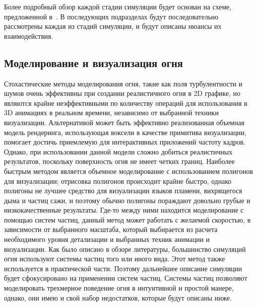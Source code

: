 Более подробный обзор каждой стадии симуляции будет основан на схеме,
предложенной в~\cite{realistic_sim}. В последующих подразделах будут
последовательно рассмотрены каждая из стадий симуляции, и будут описаны нюансы
их взаимодействия.

\subsection{Моделирование и визуализация огня}

Стохастические методы моделирования огня, такие как поля турбулентности и шумов
очень эффективны при создании реалистичного огня в 2D графике, но являются
крайне неэффективными по количеству операций для использования в 3D анимациях в
реальном времени, независимо от выбранной техники визуализации. Альтернативой
может быть эффективно реализованная объемная модель рендеринга, использующая
воксели в качестве примитива визуализации, помогает достичь приемлемую для
интерактивных приложений частоту кадров. Однако, при использовании данной модели
сложно добиться реалистичных результатов, поскольку поверхность огня не имеет
четких границ. Наиболее быстрым методом является объемное моделирование с
использованием полигонов для визуализации; отрисовка полигонов происходит крайне
быстро, однако полигоны не лучшее средство для визуализации языков пламени,
вихрящегося дыма и частиц сажи, и поэтому обычно полигоны пораждают довольно
грубые и низкокачественные результаты. Где-то между ними находится моделирование
с помощью систем частиц, данный метод может работать с желаемой скоростью, в
зависимости от выбранного масштаба, который выбирается из расчета необходимого
уровня детализации и выбранных техник анимации и визуализации. Как было описано
в обзоре литературы, большинство симуляций огня используют системы частиц того
или иного вида. Этот метод также используется в практической части. Поэтому
дальнейшее описание симуляции будет сфокусировано на применении систем частиц.
Системы частиц позволяют моделировать трехмерное поведение огня в интуитивной и
простой манере, однако, они имею и свой набор недостатков, которые будут описаны
ниже.

